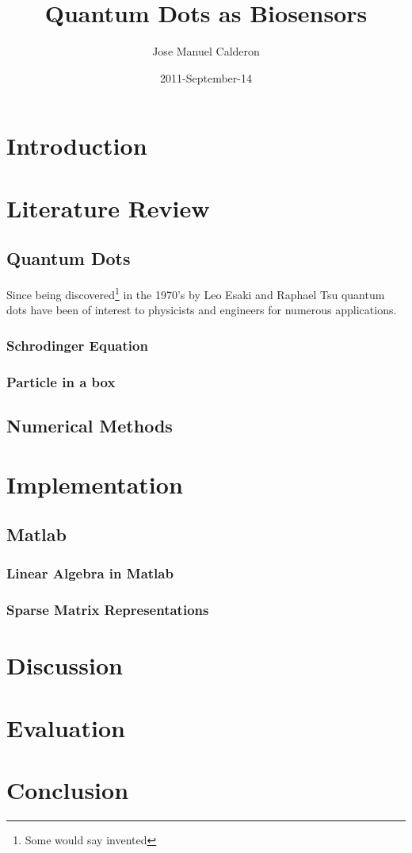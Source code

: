 \documentclass[authoryearcitations]{UoYCSproject}
\author{Jose Manuel Calderon}
\title{Quantum Dots as Biosensors}
\date{2011-September-14}
\begin{document}
 
\maketitle
\chapter{Introduction}

\chapter{Literature Review}

\section{Quantum Dots}
Since being discovered\footnote{Some would say invented} in the 1970's by Leo Esaki and Raphael Tsu quantum
dots have been of interest to physicists and engineers for numerous applications. 
\subsection{Schrodinger Equation}

\subsection{Particle in a box}



\section{Numerical Methods}

\chapter{Implementation}
\section{Matlab}

\subsection{Linear Algebra in Matlab}



\subsection{Sparse Matrix Representations}


\chapter{Discussion}

\chapter{Evaluation}

\chapter{Conclusion}
\end{document}

